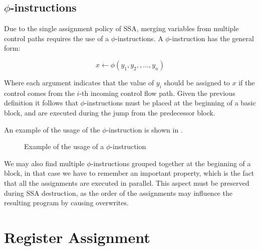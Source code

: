 \subsection{$\phi$-instructions}
\label{subsec:phi}

Due to the single assignment policy of SSA, merging variables from multiple control paths requires the use of a $\phi$-instructions. A $\phi$-instruction has the general form:

\[
x \leftarrow \phi(y_1, y_2, , \dots, y_n)
\]

Where each argument indicates that the value of $y_i$ should be assigned to $x$ if the control comes from the $i$-th incoming control flow path. Given the previous definition it follows that $\phi$-instructions must be placed at the beginning of a basic block, and are executed during the jump from the predecessor block.

An example of the usage of the $\phi$-instruction is shown in .

\begin{figure}[ht]
    \centering
    \caption{Example of the usage of a $\phi$-instruction}
    \label{fig:phi-usage}
\end{figure}

We may also find multiple $\phi$-instructions grouped together at the beginning of a block, in that case we have to remember an important property, which is the fact that all the assignments are executed in parallel. This aspect must be preserved during SSA destruction, as the order of the assignments may influence the resulting program by causing overwrites.

\section{Register Assignment}
\label{sec:ra}

